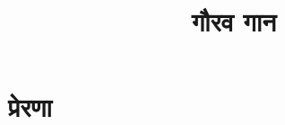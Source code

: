 \documentclass{book}
\title{गौरव गान}
\author{}
\date{}
\begin{document}
\maketitle
\tableofcontents

\chapter{प्रेरणा}



\end{document}
